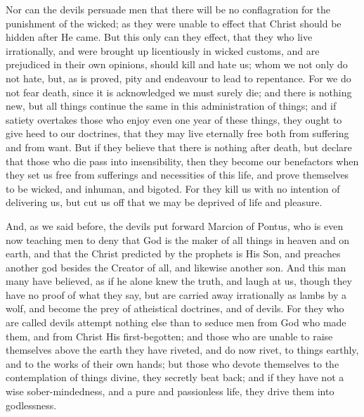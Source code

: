 
Nor can the devils persuade men that there will be no conflagration for the punishment of the wicked; as they were unable to effect that Christ should be hidden after He came. But this only can they effect, that they who live irrationally, and were brought up licentiously in wicked customs, and are prejudiced in their own opinions, should kill and hate us; whom we not only do not hate, but, as is proved, pity and endeavour to lead to repentance. For we do not fear death, since it is acknowledged we must surely die; and there is nothing new, but all things continue the same in this administration of things; and if satiety overtakes those who enjoy even one year of these things, they ought to give heed to our doctrines, that they may live eternally free both from suffering and from want. But if they believe that there is nothing after death, but declare that those who die pass into insensibility, then they become our benefactors when they set us free from sufferings and necessities of this life, and prove themselves to be wicked, and inhuman, and bigoted. For they kill us with no intention of delivering us, but cut us off that we may be deprived of life and pleasure.


And, as we said before, the devils put forward Marcion of Pontus, who is even now teaching men to deny that God is the maker of all things in heaven and on earth, and that the Christ predicted by the prophets is His Son, and preaches another god besides the Creator of all, and likewise another son. And this man many have believed, as if he alone knew the truth, and laugh at us, though they have no proof of what they say, but are carried away irrationally as lambs by a wolf, and become the prey of atheistical doctrines, and of devils. For they who are called devils attempt nothing else than to seduce men from God who made them, and from Christ His first-begotten; and those who are unable to raise themselves above the earth they have riveted, and do now rivet, to things earthly, and to the works of their own hands; but those who devote themselves to the contemplation of things divine, they secretly beat back; and if they have not a wise sober-mindedness, and a pure and passionless life, they drive them into godlessness.


